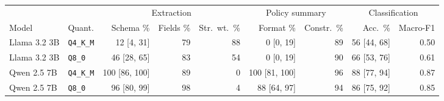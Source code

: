 \begin{tabular}{llrrrrrrr}
\toprule
 & & \multicolumn{3}{c}{Extraction} & \multicolumn{2}{c}{Policy summary} & \multicolumn{2}{c}{Classification} \\
\cmidrule(lr){3-5}\cmidrule(lr){6-7}\cmidrule(lr){8-9}
Model & Quant. & Schema \% & Fields \% & Str.\ wt.\ \% & Format \% & Constr.\ \% & Acc.\ \% & Macro-F1 \\
\midrule
Llama 3.2 3B & \texttt{Q4\_K\_M} & 12 {\scriptsize[4, 31]} & 79 & 88 & 0 {\scriptsize[0, 19]} & 89 & 56 {\scriptsize[44, 68]} & 0.50 \\
Llama 3.2 3B & \texttt{Q8\_0} & 46 {\scriptsize[28, 65]} & 83 & 54 & 0 {\scriptsize[0, 19]} & 90 & 66 {\scriptsize[53, 76]} & 0.61 \\
Qwen 2.5 7B & \texttt{Q4\_K\_M} & 100 {\scriptsize[86, 100]} & 89 & 0 & 100 {\scriptsize[81, 100]} & 96 & 88 {\scriptsize[77, 94]} & 0.87 \\
Qwen 2.5 7B & \texttt{Q8\_0} & 96 {\scriptsize[80, 99]} & 98 & 4 & 88 {\scriptsize[64, 97]} & 94 & 86 {\scriptsize[75, 92]} & 0.85 \\
\bottomrule
\end{tabular}
